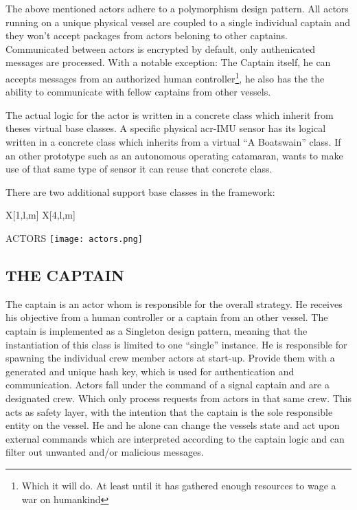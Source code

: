 The above mentioned actors adhere to a polymorphism design pattern. All actors running on a unique physical vessel are
coupled to a single individual captain and they won't accept packages from actors beloning to other captains.
Communicated between actors is encrypted by default, only authenicated messages are processed. With a notable exception:
The Captain itself, he can accepts messages from an authorized human controller\footnote{Which it will do. At least
until it has gathered enough resources to wage a war on humankind}, he also has the the ability to communicate with
fellow captains from other vessels.

The actual logic for the actor is written in a concrete class which inherit from theses virtual base classes. A specific
physical \gls{acr-IMU} sensor has its logical written in a concrete class which inherits from a virtual ``A Boatswain''
class. If an other prototype such as an autonomous operating catamaran, wants to make use of that same type of sensor it
can reuse that concrete class.

\noindent There are two additional support base classes in the framework:

\begin{RoyalTable}{X[1,l,m] X[4,l,m]}
\end{RoyalTable}

\begin{RoyalFigure}[htb, label=fig:actors]{ACTORS}
    \texttt{[image: actors.png]}
\end{RoyalFigure}

\subsection{THE CAPTAIN}\label{seq:the captain}

The captain is an actor whom is responsible for the overall strategy. He receives his objective from a human controller
or a captain from an other vessel. The captain is implemented as a Singleton design pattern, meaning that the
instantiation of this class is limited to one ``single'' instance. He is responsible for spawning the individual crew
member actors at start-up. Provide them with a generated and unique hash key, which is used for authentication and
communication. Actors fall under the command of a signal captain and are a designated crew. Which only process requests
from actors in that same crew. This acts as safety layer, with the intention that the captain is the sole responsible
entity on the vessel. He and he alone can change the vessels state and act upon external commands which are interpreted
according to the captain logic and can filter out unwanted and/or malicious messages.

